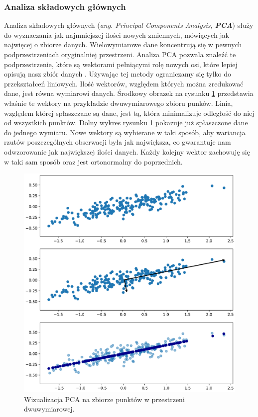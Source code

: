 \documentclass[a4paper,12pt,oneside]{book} %
\begin{document}
\subsubsection{Analiza składowych głównych}
Analiza składowych głównych (\textit{ang. Principal Components Analysis, \textbf{PCA}}) służy do wyznaczania jak najmniejszej ilości nowych zmiennych, mówiących jak najwięcej o zbiorze danych. Wielowymiarowe dane koncentrują się w pewnych podprzestrzeniach oryginalniej przestrzeni. Analiza PCA pozwala znaleźć te podprzestrzenie, które są wektorami pełniącymi rolę nowych osi, które lepiej opisują nasz zbiór danych \cite{redukcjawymiarow}. Używając tej metody ograniczamy się tylko do przekształceń liniowych. Ilość wektorów, względem których można zredukować dane, jest równa wymiarowi danych. Środkowy obrazek na rysunku \ref{fig:pca} przedstawia właśnie te wektory na przykładzie dwuwymiarowego zbioru punków. Linia, względem której spłaszczane są dane, jest tą, która minimalizuje odległość do niej od wszystkich punktów. Dolny wykres rysunku \ref{fig:pca} pokazuje już spłaszczone dane do jednego wymiaru. Nowe wektory są wybierane w taki sposób, aby wariancja rzutów poszczególnych obserwacji była jak największa, co gwarantuje nam odwzorowanie jak największej ilości danych. Każdy kolejny wektor zachowuję się w taki sam sposób oraz jest ortonormalny do poprzednich.
\begin{figure}[h!]
	\centering
	\includegraphics[width=\textwidth]{pca.pdf}
	\caption{Wizualizacja PCA na zbiorze punktów w przestrzeni dwuwymiarowej.}
	\label{fig:pca}
\end{figure}
\end{document}
